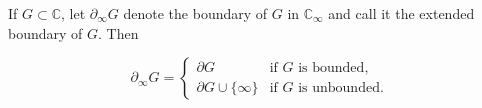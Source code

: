 If $G \subset \mathbb{C}$, let $\partial_{\infty} G$ denote the boundary of $G$ in $\mathbb{C}_{\infty}$ and call it the extended boundary of $G$. Then

$$\partial_{\infty} G = \begin{cases}
\partial G & \text{if } G \text{ is bounded}, \\
\partial G \cup \{\infty\} & \text{if } G \text{ is unbounded}.
\end{cases}$$
